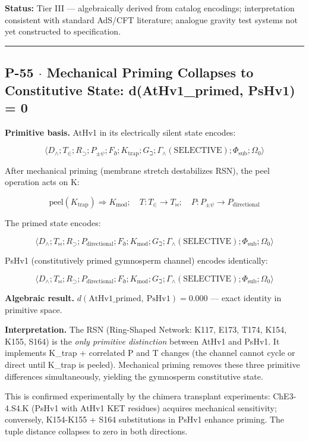 \documentclass[12pt,a4paper]{article}
\begin{document}
\textbf{Status:} Tier III --- algebraically derived from catalog encodings; interpretation consistent with standard AdS/CFT literature; analogue gravity test systems not yet constructed to specification.

\begin{center}
\rule{0.5\textwidth}{0.4pt}
\end{center}

\subsection{P-55 $\cdot$ Mechanical Priming Collapses to Constitutive State: d(AtHv1\_primed, PsHv1) = 0}

\textbf{Primitive basis.} AtHv1 in its electrically silent state encodes:

\[\langle D_\wedge; T_\in; R_\supset; P_{\pm\psi}; F_\eth; K_\text{trap}; G_\beth; \Gamma_\wedge(\text{SELECTIVE}); \Phi_\text{sub}; \Omega_0 \rangle\]

After mechanical priming (membrane stretch destabilizes RSN), the peel operation acts on K:

\[\text{peel}(K_\text{trap}) \Rightarrow K_\text{mod}; \quad T: T_\in \to T_\bowtie; \quad P: P_{\pm\psi} \to P_\text{directional}\]

The primed state encodes:

\[\langle D_\wedge; T_\bowtie; R_\supset; P_\text{directional}; F_\eth; K_\text{mod}; G_\beth; \Gamma_\wedge(\text{SELECTIVE}); \Phi_\text{sub}; \Omega_0 \rangle\]

PsHv1 (constitutively primed gymnosperm channel) encodes identically:

\[\langle D_\wedge; T_\bowtie; R_\supset; P_\text{directional}; F_\eth; K_\text{mod}; G_\beth; \Gamma_\wedge(\text{SELECTIVE}); \Phi_\text{sub}; \Omega_0 \rangle\]

\textbf{Algebraic result.} $d(\text{AtHv1\_primed},\ \text{PsHv1}) = 0.000$ --- exact identity in primitive space.

\textbf{Interpretation.} The RSN (Ring-Shaped Network: K117, E173, T174, K154, K155, S164) is the \emph{only primitive distinction} between AtHv1 and PsHv1. It implements K\_trap + correlated P and T changes (the channel cannot cycle or direct until K\_trap is peeled). Mechanical priming removes these three primitive differences simultaneously, yielding the gymnosperm constitutive state.

This is confirmed experimentally by the chimera transplant experiments: ChE3-4.S4.K (PsHv1 with AtHv1 KET residues) acquires mechanical sensitivity; conversely, K154-K155 + S164 substitutions in PsHv1 enhance priming. The tuple distance collapses to zero in both directions.
\end{document}
